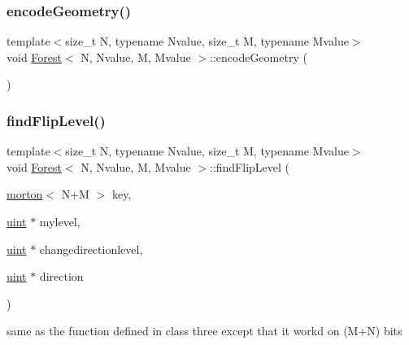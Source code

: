 \mbox{\label{classForest_ab35e2068b9c64707eb15947713164650}} 
\subsubsection{\texorpdfstring{encode\+Geometry()}{encodeGeometry()}}
{\footnotesize\ttfamily template$<$size\+\_\+t N, typename Nvalue, size\+\_\+t M, typename Mvalue$>$ \\
void \mbox{\hyperlink{classForest}{Forest}}$<$ N, Nvalue, M, Mvalue $>$\+::encode\+Geometry (\begin{DoxyParamCaption}{ }\end{DoxyParamCaption})}

\mbox{\label{classForest_a9f4c2ca62b32666e84a7d546ae28e996}} 
\subsubsection{\texorpdfstring{find\+Flip\+Level()}{findFlipLevel()}}
{\footnotesize\ttfamily template$<$size\+\_\+t N, typename Nvalue, size\+\_\+t M, typename Mvalue$>$ \\
void \mbox{\hyperlink{classForest}{Forest}}$<$ N, Nvalue, M, Mvalue $>$\+::find\+Flip\+Level (\begin{DoxyParamCaption}\item[{\mbox{\hyperlink{definitions_8h_af8682350bd8bb38ee9023f7a0a310add}{morton}}$<$ N+M $>$}]{key,  }\item[{\mbox{\hyperlink{definitions_8h_a69aa29b598b851b0640aa225a9e5d61d}{uint}} $\ast$}]{mylevel,  }\item[{\mbox{\hyperlink{definitions_8h_a69aa29b598b851b0640aa225a9e5d61d}{uint}} $\ast$}]{changedirectionlevel,  }\item[{\mbox{\hyperlink{definitions_8h_a69aa29b598b851b0640aa225a9e5d61d}{uint}} $\ast$}]{direction }\end{DoxyParamCaption})}

same as the function defined in class three except that it workd on (M+N) bits \mbox{\label{classForest_a30da3b079d5b869bc416cf6856ec0fee}} 
